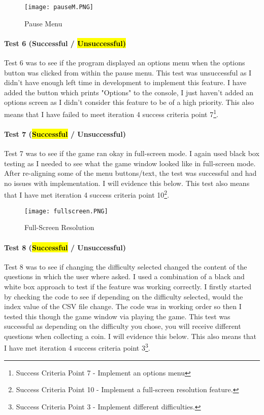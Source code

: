 \documentclass[12pt]{report}
\begin{document}
\begin{figure}[H]
    \centering
    \texttt{[image: pauseM.PNG]}
    \caption{Pause Menu}
\end{figure}

\paragraph{Test 6 (Successful / \hl{Unsuccessful)}}
Test 6 was to see if the program displayed an options menu when the options button was clicked from within the pause menu. This test was unsuccessful as I didn't have enough left time in development to implement this feature. I have added the button which prints "Options" to the console, I just haven't added an options screen as I didn't consider this feature to be of a high priority. This also means that I have failed to meet iteration 4 success criteria point 7\footnote{Success Criteria Point 7 - Implement an options menu}.

\paragraph{Test 7 (\hl{Successful} / Unsuccessful)}
Test 7 was to see if the game ran okay in full-screen mode. I again used black box testing as I needed to see what the game window looked like in full-screen mode. After re-aligning some of the menu buttons/text, the test was successful and had no issues with implementation. I will evidence this below. This test also means that I have met iteration 4 success criteria point 10\footnote{Success Criteria Point 10 - Implement a full-screen resolution feature.}.

\begin{figure}[H]
    \centering
    \texttt{[image: fullscreen.PNG]}
    \caption{Full-Screen Resolution}
\end{figure}

\paragraph{Test 8 (\hl{Successful} / Unsuccessful)}
Test 8 was to see if changing the difficulty selected changed the content of the questions in which the user where asked. I used a combination of a black and white box approach to test if the feature was working correctly. I firstly started by checking the code to see if depending on the difficulty selected, would the index value of the CSV file change. The code was in working order so then I tested this though the game window via playing the game. This test was successful as depending on the difficulty you chose, you will receive different questions when collecting a coin. I will evidence this below. This also means that I have met iteration 4 success criteria point 3\footnote{Success Criteria Point 3 - Implement different difficulties.}.
\end{document}
